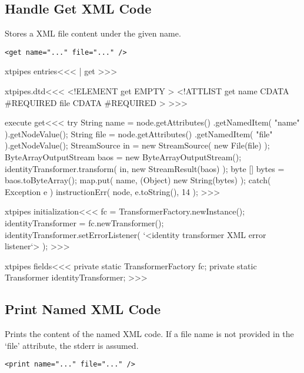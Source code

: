 \documentclass{article}
\begin{document}
{%
\subsection{Handle Get XML Code}

Stores a XML file content under the given name.

\begin{verbatim}
<get name="..." file="..." />
\end{verbatim}


\<xtpipes entries\><<<
| get
>>>


\<xtpipes.dtd\><<<
<!ELEMENT get EMPTY >
<!ATTLIST get
          name CDATA #REQUIRED
          file CDATA #REQUIRED
>
>>>


\<execute get\><<<
try {
  String name = node.getAttributes()
                  .getNamedItem( "name" ).getNodeValue();
  String file = node.getAttributes()
               .getNamedItem( "file" ).getNodeValue();
  StreamSource in   = new StreamSource( new File(file) );
  ByteArrayOutputStream baos = new ByteArrayOutputStream();
  identityTransformer.transform( in, new StreamResult(baos) );
  byte [] bytes = baos.toByteArray();
  map.put( name, (Object) new String(bytes) );
} catch( Exception e ){
   instructionErr( node, e.toString(), 14 );
}
>>>



\<xtpipes initialization\><<<
fc = TransformerFactory.newInstance();
identityTransformer =  fc.newTransformer();
identityTransformer.setErrorListener(
    `<identity transformer XML error listener`> );
>>>

\<xtpipes fields\><<<
private static TransformerFactory fc;
private static Transformer identityTransformer;
>>>



\subsection{Print Named XML Code}

Prints the content of the named XML code. If a file name is not
provided in the `file' attribute,
the stderr is assumed.

\begin{verbatim}
<print name="..." file="..." />
\end{verbatim}



}
\end{document}
